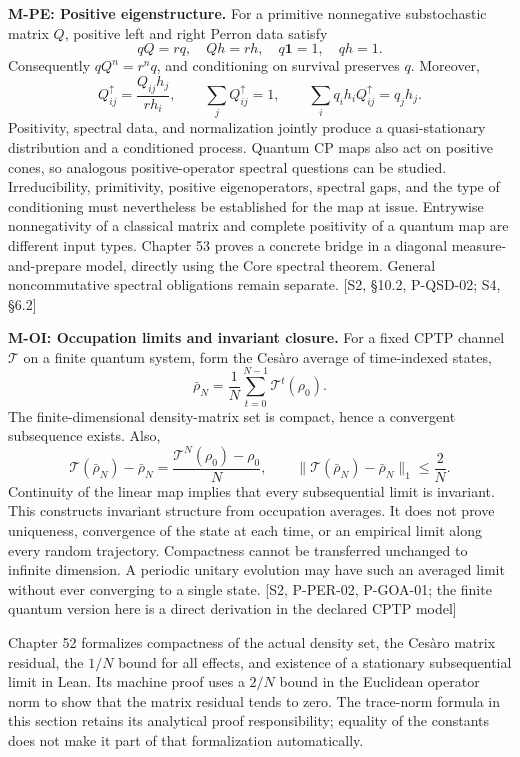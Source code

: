 \documentclass[
  11pt,
  oneside]{book}
\begin{document}
\textbf{M-PE: Positive eigenstructure.} For a primitive nonnegative
substochastic matrix \(Q\), positive left and right Perron data satisfy
\[
qQ=rq,\quad Qh=rh,\quad q\mathbf1=1,\quad qh=1.
\] Consequently \(qQ^n=r^nq\), and conditioning on survival preserves
\(q\). Moreover, \[
Q^\uparrow_{ij}=\frac{Q_{ij}h_j}{rh_i},\qquad
\sum_jQ^\uparrow_{ij}=1,\qquad
\sum_iq_i h_iQ^\uparrow_{ij}=q_jh_j.
\] Positivity, spectral data, and normalization jointly produce a
quasi-stationary distribution and a conditioned process. Quantum CP maps
also act on positive cones, so analogous positive-operator spectral
questions can be studied. Irreducibility, primitivity, positive
eigenoperators, spectral gaps, and the type of conditioning must
nevertheless be established for the map at issue. Entrywise
nonnegativity of a classical matrix and complete positivity of a quantum
map are different input types. Chapter 53 proves a concrete bridge in a
diagonal measure-and-prepare model, directly using the Core spectral
theorem. General noncommutative spectral obligations remain separate.
{[}S2, §10.2, P-QSD-02; S4, §6.2{]}

\textbf{M-OI: Occupation limits and invariant closure.} For a fixed CPTP
channel \(\mathcal T\) on a finite quantum system, form the Cesàro
average of time-indexed states, \[
\bar\rho_N=\frac1N\sum_{t=0}^{N-1}\mathcal T^t(\rho_0).
\] The finite-dimensional density-matrix set is compact, hence a
convergent subsequence exists. Also, \[
\mathcal T(\bar\rho_N)-\bar\rho_N=
\frac{\mathcal T^N(\rho_0)-\rho_0}{N},\qquad
\|\mathcal T(\bar\rho_N)-\bar\rho_N\|_1\le\frac2N.
\] Continuity of the linear map implies that every subsequential limit
is invariant. This constructs invariant structure from occupation
averages. It does not prove uniqueness, convergence of the state at each
time, or an empirical limit along every random trajectory. Compactness
cannot be transferred unchanged to infinite dimension. A periodic
unitary evolution may have such an averaged limit without ever
converging to a single state. {[}S2, P-PER-02, P-GOA-01; the finite
quantum version here is a direct derivation in the declared CPTP
model{]}

Chapter 52 formalizes compactness of the actual density set, the Cesàro
matrix residual, the \(1/N\) bound for all effects, and existence of a
stationary subsequential limit in Lean. Its machine proof uses a \(2/N\)
bound in the Euclidean operator norm to show that the matrix residual
tends to zero. The trace-norm formula in this section retains its
analytical proof responsibility; equality of the constants does not make
it part of that formalization automatically.
\end{document}
